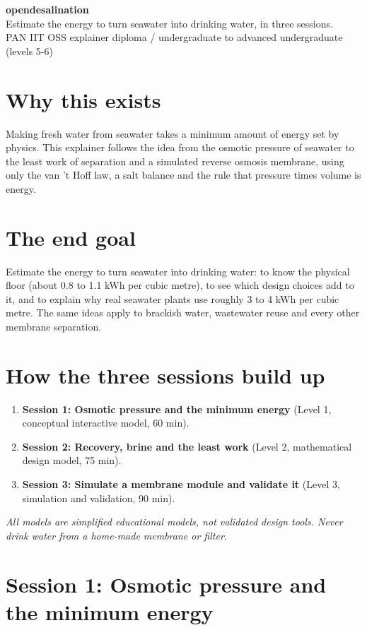 \documentclass[11pt,a4paper]{article}
\begin{document}
\begin{center}{\LARGE\bfseries opendesalination}\\[0.4em]{\large Estimate the energy to turn seawater into drinking water, in three sessions.}\\[0.2em]\small PAN IIT OSS explainer \textbullet{} diploma / undergraduate to advanced undergraduate (levels 5-6)\end{center}

\section*{Why this exists}
Making fresh water from seawater takes a minimum amount of energy set by physics. This explainer follows the idea from the osmotic pressure of seawater to the least work of separation and a simulated reverse osmosis membrane, using only the van 't Hoff law, a salt balance and the rule that pressure times volume is energy.

\section*{The end goal}
Estimate the energy to turn seawater into drinking water: to know the physical floor (about 0.8 to 1.1 kWh per cubic metre), to see which design choices add to it, and to explain why real seawater plants use roughly 3 to 4 kWh per cubic metre. The same ideas apply to brackish water, wastewater reuse and every other membrane separation.

\section*{How the three sessions build up}
\begin{enumerate}[nosep]
\item \textbf{Session 1: Osmotic pressure and the minimum energy} (Level 1, conceptual interactive model, 60 min).
\item \textbf{Session 2: Recovery, brine and the least work} (Level 2, mathematical design model, 75 min).
\item \textbf{Session 3: Simulate a membrane module and validate it} (Level 3, simulation and validation, 90 min).
\end{enumerate}

\textit{All models are simplified educational models, not validated design tools. Never drink water from a home-made membrane or filter.}

\section{Session 1: Osmotic pressure and the minimum energy}
\end{document}
